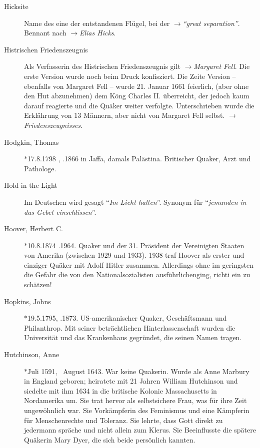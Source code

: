 \begin{description}
 \item[Hicksite] Name des eine der entstandenen Flügel, bei der $\to$\textit{"`great separation"'}. Bennant nach $\to$\textit{Elias Hicks}.

 \item[Histrischen Friedenszeugnis] Als Verfasserin des Histrischen Friedenszeugnis gilt $\to$\textit{Margaret Fell}. Die erste Version wurde noch beim Druck konfisziert. Die Zeite Version -- ebenfalls von Margaret Fell -- wurde 21. Januar 1661 feierlich, (aber ohne den Hut abzunehmen) dem Köng Charles II. überreicht, der jedoch kaum darauf reagierte und die Quäker weiter verfolgte. Unterschrieben wurde die Erklährung von 13 Männern, aber nicht von Margaret Fell selbst. $\to$\textit{Friedenszeugnisses}.

 
 \item[Hodgkin, Thomas] $\ast$17.8.1798 , .1866 in Jaffa, damals
 Palästina. Britischer Quaker, Arzt und Pathologe.

\item[Hold in the Light] Im Deutschen wird gesagt "`\textit{Im Licht halten}"'.
Synonym für "`\textit{jemanden in das Gebet einschlissen}"'.

 \item[Hoover, Herbert C.] $\ast$10.8.1874 .1964. Quaker und der 31.
 Präsident der Vereinigten Staaten von Amerika (zwischen 1929 und 1933). 1938
 traf Hoover als erster und einziger Quäker mit Adolf Hitler zusammen.
 Allerdings ohne im geringsten die Gefahr die von den Nationalsozialisten
 ausführlichenging, richti ein zu schätzen!

 \item[Hopkins, Johns] $\ast$19.5.1795, .1873. US-amerikanischer Quaker,
 Geschäftsmann und Philanthrop. Mit seiner beträchtlichen Hinterlassenschaft
 wurden die Universität und das Krankenhaus gegründet, die seinen Namen tragen.

 \item[Hutchinson, Anne] $\ast$Juli 1591, \dag~August 1643. War keine Quakerin. Wurde als Anne Marbury in England geboren; heiratete mit 21 Jahren William Hutchinson und siedelte mit ihm 1634 in die britische Kolonie Massachusetts in Nordamerika um. Sie trat hervor als selbstsichere Frau, was für ihre Zeit ungewöhnlich war. Sie Vorkämpferin des Feminismus und eine Kämpferin für Menschenrechte und Toleranz. Sie lehrte, dass Gott direkt zu jedermann spräche und nicht allein zum Klerus. Sie Beeinflusste die spätere Quäkerin Mary Dyer, die sich beide persönlich kannten.


 \end{description}

\normalsize
